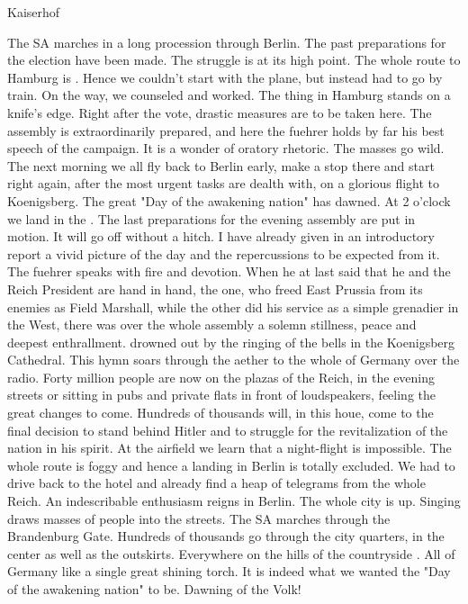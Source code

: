 Kaiserhof

The SA marches in a long procession through Berlin. The past preparations for the election have been made. The struggle is at its high point. The whole route to Hamburg is . Hence we couldn't start with the plane, but instead had to go by train. On the way, we counseled and worked. The thing in Hamburg stands on a knife's edge. Right after the vote, drastic measures are to be taken here. The assembly is extraordinarily prepared, and here the fuehrer holds by far his best speech of the campaign. It is a wonder of oratory rhetoric. The masses go wild. The next morning we all fly back to Berlin early, make a stop there and start right again, after the most urgent tasks are dealth with, on a glorious flight to Koenigsberg. The great "Day of the awakening nation" has dawned. At 2 o'clock we land in the . The last preparations for the evening assembly are put in motion. It will go off without a hitch. I have already given in an introductory report a vivid picture of the day and the repercussions to be expected from it. The fuehrer speaks with fire and devotion. When he at last said that he and the Reich President are hand in hand, the one, who freed East Prussia from its enemies as Field Marshall, while the other did his service as a simple grenadier in the West, there was over the whole assembly a solemn stillness, peace and deepest enthrallment.  drowned out by the ringing of the bells in the Koenigsberg Cathedral. This hymn soars through the aether to the whole of Germany over the radio. Forty million people are now on the plazas of the Reich, in the evening streets or sitting in pubs and private flats in front of loudspeakers, feeling the great changes to come. Hundreds of thousands will, in this houe, come to the final decision to stand behind Hitler and to struggle for the revitalization of the nation in his spirit. At the airfield we learn that a night-flight is impossible. The whole route is foggy and hence a landing in Berlin is totally excluded. We had to drive back to the hotel and already find a heap of telegrams from the whole Reich. An indescribable enthusiasm reigns in Berlin. The whole city is up. Singing draws masses of people into the streets. The SA marches  through the Brandenburg Gate. Hundreds of thousands go through the city quarters, in the center as well as the outskirts. Everywhere on the hills of the countryside . All of Germany like a single great shining torch. It is indeed what we wanted the "Day of the awakening nation" to be. Dawning of the Volk!
